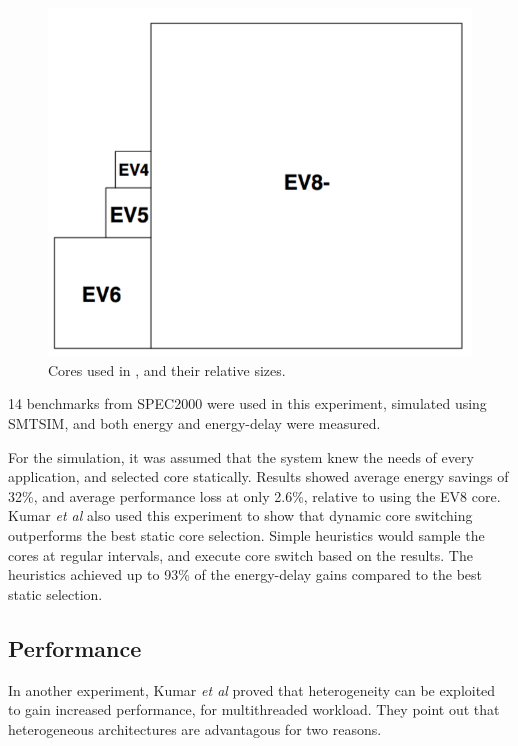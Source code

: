 \begin{figure}[htb]
    \centering
    \includegraphics[width=1.0\textwidth]{Figures/Heterogeneous/Kumar1}
    \caption{Cores used in \cite{heterogeneous-ee}, and their relative sizes.}
    \label{fig:Kumar1}
\end{figure}


14 benchmarks from SPEC2000 were used in this experiment, simulated using SMTSIM, and both energy and energy-delay were measured.

For the simulation, it was assumed that the system knew the needs of every application, and selected core statically. 
Results showed average energy savings of 32\%, and average performance loss at only 2.6\%, relative to using the EV8 core.
Kumar \textit{et al} also used this experiment to show that dynamic core switching outperforms the best static core selection.
Simple heuristics would sample the cores at regular intervals, and execute core switch based on the results.
The heuristics achieved up to 93\% of the energy-delay gains compared to the best static selection. 

\subsection{Performance}
\label{subsec:rw_perf}
In another experiment, Kumar \textit{et al}\cite{heterogeneous-perf} proved that heterogeneity can be exploited to gain increased performance, for multithreaded workload.
They point out that heterogeneous architectures are advantagous for two reasons.

